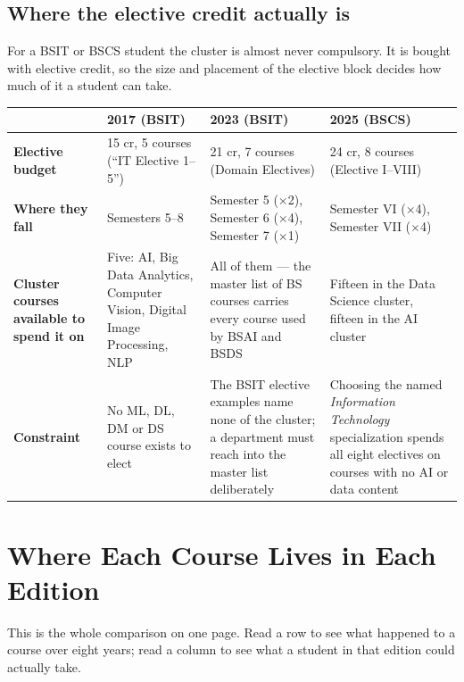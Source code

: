 \documentclass[11pt,a4paper,oneside]{report}
\begin{document}
\subsection{Where the elective credit actually is}

For a BSIT or BSCS student the cluster is almost never compulsory. It is bought
with elective credit, so the size and placement of the elective block decides how
much of it a student can take.

\begin{longtable}{@{}L{2.5cm}L{4.3cm}L{4.3cm}L{4.2cm}@{}}
\toprule
{}
\textbf{} & \textbf{\color{ed2017}2017 (BSIT)} & \textbf{\color{ed2023}2023 (BSIT)} & \textbf{\color{ed2025}2025 (BSCS)} \\
\midrule
\endhead
\textbf{Elective budget} &
15 cr, 5 courses (``IT Elective 1--5'') &
21 cr, 7 courses (Domain Electives) &
24 cr, 8 courses (Elective I--VIII) \\
\textbf{Where they fall} &
Semesters 5--8 &
Semester 5 ($\times$2), Semester 6 ($\times$4), Semester 7 ($\times$1) &
Semester VI ($\times$4), Semester VII ($\times$4) \\
\textbf{Cluster courses available to spend it on} &
Five: AI, Big Data Analytics, Computer Vision, Digital Image Processing, NLP &
All of them --- the master list of BS courses carries every course used by BSAI and BSDS &
Fifteen in the Data Science cluster, fifteen in the AI cluster \\
\textbf{Constraint} &
No ML, DL, DM or DS course exists to elect &
The BSIT elective examples name none of the cluster; a department must reach into the master list deliberately &
Choosing the named \emph{Information Technology} specialization spends all eight electives on courses with no AI or data content \\
\bottomrule
\end{longtable}

\section{Where Each Course Lives in Each Edition}

This is the whole comparison on one page. Read a row to see what happened to a
course over eight years; read a column to see what a student in that edition
could actually take.
\end{document}
